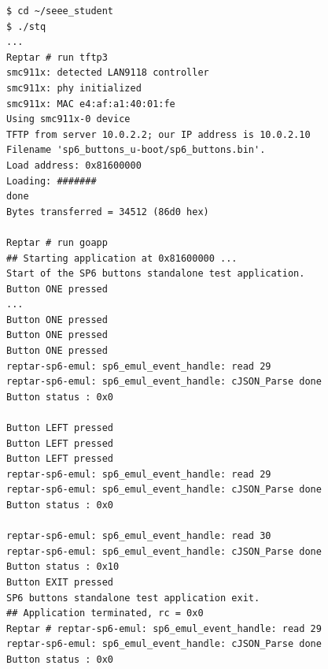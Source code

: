 \begin{lstlisting}
$ cd ~/seee_student
$ ./stq
...
Reptar # run tftp3
smc911x: detected LAN9118 controller
smc911x: phy initialized
smc911x: MAC e4:af:a1:40:01:fe
Using smc911x-0 device
TFTP from server 10.0.2.2; our IP address is 10.0.2.10
Filename 'sp6_buttons_u-boot/sp6_buttons.bin'.
Load address: 0x81600000
Loading: #######
done
Bytes transferred = 34512 (86d0 hex)

Reptar # run goapp
## Starting application at 0x81600000 ...
Start of the SP6 buttons standalone test application.
Button ONE pressed
...
Button ONE pressed
Button ONE pressed
Button ONE pressed
reptar-sp6-emul: sp6_emul_event_handle: read 29 
reptar-sp6-emul: sp6_emul_event_handle: cJSON_Parse done 
Button status : 0x0

Button LEFT pressed
Button LEFT pressed
Button LEFT pressed
reptar-sp6-emul: sp6_emul_event_handle: read 29 
reptar-sp6-emul: sp6_emul_event_handle: cJSON_Parse done 
Button status : 0x0

reptar-sp6-emul: sp6_emul_event_handle: read 30 
reptar-sp6-emul: sp6_emul_event_handle: cJSON_Parse done 
Button status : 0x10
Button EXIT pressed
SP6 buttons standalone test application exit.
## Application terminated, rc = 0x0
Reptar # reptar-sp6-emul: sp6_emul_event_handle: read 29 
reptar-sp6-emul: sp6_emul_event_handle: cJSON_Parse done 
Button status : 0x0
\end{lstlisting}
